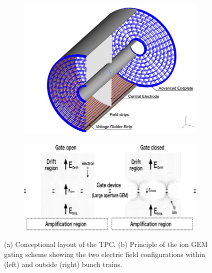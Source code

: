 \begin{figure}[t!]
\begin{subfigure}{0.45\textwidth}
\includegraphics[width=1\hsize]{Detector/fig/TPC.png}
\caption{}
\end{subfigure}
\begin{subfigure}{0.45\textwidth}
\includegraphics[width=1\hsize]{Detector/fig/gate.jpg}
\caption{}
\end{subfigure}
\caption[TPC layout]{(a) Conceptional layout of the TPC. (b) Principle of the ion GEM gating scheme showing the two electric field configurations within (left) and outside (right) bunch trains.}
\label{fig:det:TPC}
\end{figure}

